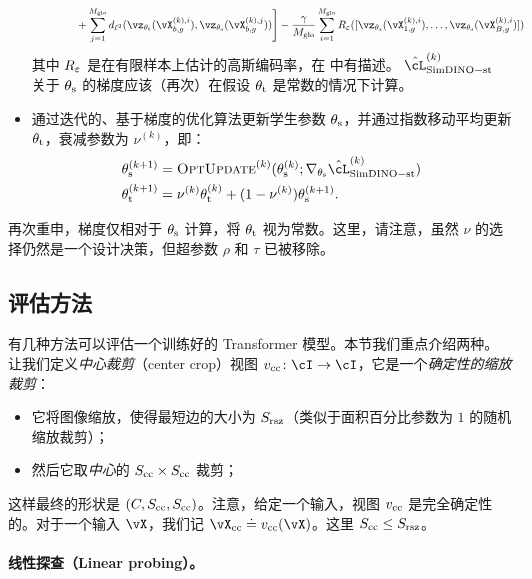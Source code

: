 \documentclass[../../book-main_zh.tex]{subfiles}
\begin{document}
\begin{itemize}
\begin{align}
        &\qquad \qquad + \sum_{j = 1}^{M_{\glo}}d_{\ell^{2}}(\vz_{\theta_{\teacher}}(\vX_{b, g}^{(k), i}), \vz_{\theta_{\student}}(\vX_{b, g}^{(k), j}))\Bigg] - \frac{\gamma}{M_{\glo}}\sum_{i = 1}^{M_{\glo}}R_{\eps}([\vz_{\theta_{\student}}(\vX_{1, g}^{(k), i}), \dots, \vz_{\theta_{\student}}(\vX_{B, g}^{(k), i})])\nonumber
    \end{align}
    其中 \(R_{\varepsilon}\) 是在有限样本上估计的高斯编码率，在  中有描述。 \(\hat{\cL}_{\simdino-\student\teacher}^{(k)}\) 关于 \(\theta_{\mathrm{s}}\) 的梯度应该（再次）在假设 \(\theta_{\mathrm{t}}\) 是常数的情况下计算。
    \item 通过迭代的、基于梯度的优化算法更新学生参数 \(\theta_{\mathrm{s}}\)，并通过指数移动平均更新 \(\theta_{\mathrm{t}}\)，衰减参数为 \(\nu^{(k)}\)，即：
    \begin{align}
        \theta_{\student}^{(k + 1)}
        &= \textsc{OptUpdate}^{(k)}(\theta_{\student}^{(k)}; \nabla_{\theta_{\student}}\hat{\cL}_{\simdino-\student\teacher}^{(k)}) \\
        \theta_{\teacher}^{(k + 1)}
        &= \nu^{(k)}\theta_{\teacher}^{(k)} + (1 - \nu^{(k)})\theta_{\student}^{(k + 1)}.
    \end{align}
\end{itemize}
再次重申，梯度仅相对于 \(\theta_{\mathrm{s}}\) 计算，将 \(\theta_{\mathrm{t}}\) 视为常数。这里，请注意，虽然 \(\nu\) 的选择仍然是一个设计决策，但超参数 \(\rho\) 和 \(\tau\) 已被移除。


\subsection{评估方法}\label{sub:contrastive_learning_evals}
有几种方法可以评估一个训练好的 Transformer 模型。本节我们重点介绍两种。让我们定义\textit{中心裁剪}（center crop）视图 \(v_{\cc} \colon \cI \to \cI\)，它是一个\textit{确定性的缩放裁剪}：
\begin{itemize}
    \item 它将图像缩放，使得最短边的大小为 \(S_{\mathrm{rsz}}\)（类似于面积百分比参数为 \(1\) 的随机缩放裁剪）；
    \item 然后它取\textit{中心}的 \(S_{\mathrm{cc}} \times S_{\mathrm{cc}}\) 裁剪；
\end{itemize}
这样最终的形状是 \((C, S_{\mathrm{cc}}, S_{\mathrm{cc}})\)。注意，给定一个输入，视图 \(v_{\mathrm{cc}}\) 是完全确定性的。对于一个输入 \(\vX\)，我们记 \(\vX_{\cc} \doteq v_{\cc}(\vX)\)。这里 \(S_{\mathrm{cc}} \leq S_{\mathrm{rsz}}\)。


\paragraph{线性探查（Linear probing）。}
\end{document}
